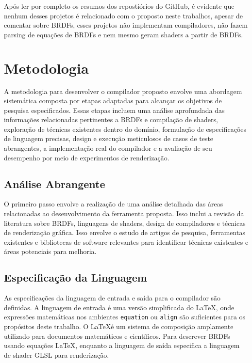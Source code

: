 \documentclass[english, 
               brazil, 
               bsc] %
               {dcomp-abntex2}
\begin{document}
Após ler por completo os resumos dos repostiórios do GitHub, é evidente que nenhum desses projetos é relacionado com o proposto neste trabalhos, apesar de comentar sobre BRDFs, esses projetos não implementam compiladores, não fazem parsing de equações de BRDFs e nem mesmo geram shaders a partir de BRDFs.

\chapter{Metodologia} \label{metodologia}

A metodologia para desenvolver o compilador proposto envolve uma abordagem sistemática composta por etapas adaptadas para alcançar os objetivos de pesquisa especificados. Essas etapas incluem uma análise aprofundada das informações relacionadas pertinentes a BRDFs e compilação de shaders, exploração de técnicas existentes dentro do domínio, formulação de especificações de linguagem precisas, design e execução meticulosos de casos de teste abrangentes, a implementação real do compilador e a avaliação de seu desempenho por meio de experimentos de renderização.


\section{Análise Abrangente} \label{analise}

O primeiro passo envolve a realização de uma análise detalhada das áreas relacionadas ao desenvolvimento da ferramenta proposta. Isso inclui a revisão da literatura sobre BRDFs, linguagens de shaders, design de compiladores e técnicas de renderização gráfica. Isso envolve o estudo de artigos de pesquisa, ferramentas existentes e bibliotecas de software relevantes para identificar técnicas existentes e áreas potenciais para melhoria.



\section{Especificação da Linguagem}

As especificações da linguagem de entrada e saída para o compilador são definidas. A linguagem de entrada é uma versão simplificada do \LaTeX , onde expressões matemáticas nos ambientes \texttt{equation} ou \texttt{align} são suficientes para os propósitos deste trabalho. O \LaTeX  é um sistema de composição amplamente utilizado para documentos matemáticos e científicos. Para descrever BRDFs usando equações \LaTeX , enquanto a linguagem de saída especifica a linguagem de shader GLSL para renderização.
\end{document}
